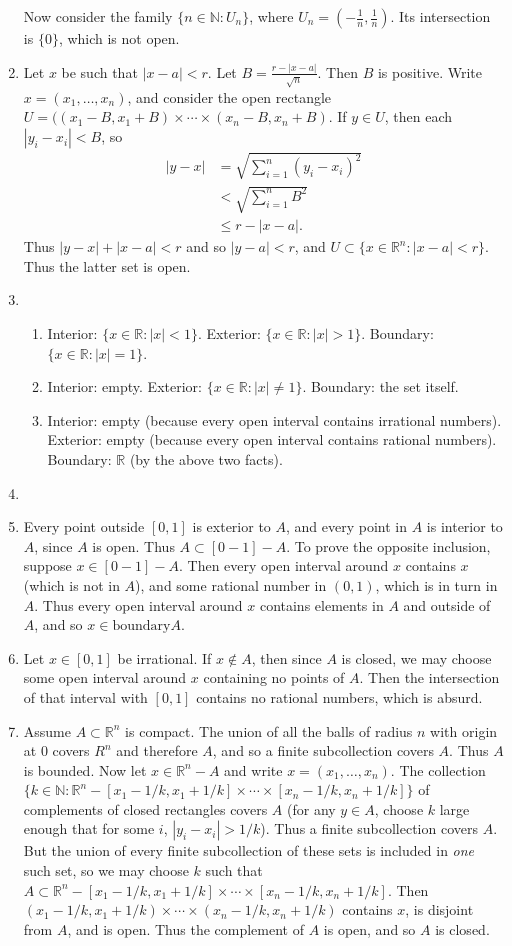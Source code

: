 \documentclass{article}
\begin{document}
\begin{enumerate}[label=\textbf{1-\arabic*.}]
Now consider the family $\{n\in\mathbb N: U_n\}$, where $U_n = (-\frac{1}{n},\frac{1}{n})$. Its intersection is $\{0\}$, which is not open.
\item Let $x$ be such that $|x-a|<r$. Let $B=\frac{r-|x-a|}{\sqrt{n}}$. Then $B$ is positive. Write $x=(x_1, \ldots, x_n)$, and consider the open rectangle $U=((x_1-B,x_1+B)\times\cdots\times (x_n-B,x_n+B)$. If $y\in U$, then each $|y_i - x_i| < B$, so 
\begin{align*}
|y-x| &= \sqrt{\sum_{i=1}^n (y_i - x_i) ^2}\\
	& < \sqrt{\sum_{i=1}^n B^2}\\
	& \leq r - |x-a|.
\end{align*}
Thus $|y-x| + |x-a| < r$ and so $|y-a| < r$, and $U\subset \{x\in\mathbb R^n:|x-a|<r\}$. Thus the latter set is open.
\item
\begin{enumerate}
\item Interior: $\{x\in\mathbb R: |x|<1\}$. Exterior: $\{x\in\mathbb R: |x|>1\}$. Boundary: $\{x\in\mathbb R: |x|=1\}$.
\item Interior: empty. Exterior: $\{x\in\mathbb R: |x|\neq 1\}$. Boundary: the set itself.
\item Interior: empty (because every open interval contains irrational numbers). Exterior: empty (because every open interval contains rational numbers). Boundary: $\mathbb R$ (by the above two facts).
\end{enumerate}
\item
\item Every point outside $[0,1]$ is exterior to $A$, and every point in $A$ is interior to $A$, since $A$ is open. Thus $A\subset [0-1]-A$. To prove the opposite inclusion, suppose $x\in [0-1]-A$. Then every open interval around $x$ contains $x$ (which is not in $A$), and some rational number in $(0,1)$, which is in turn in $A$. Thus every open interval around $x$ contains elements in $A$ and outside of $A$, and so $x\in\textrm{boundary}A$.
\item Let $x\in[0,1]$ be irrational. If $x\notin A$, then since $A$ is closed, we may choose some open interval around $x$ containing no points of $A$. Then the intersection of that interval with $[0,1]$ contains no rational numbers, which is absurd.
\item Assume $A\subset\mathbb R^n$ is compact. The union of all the balls of radius $n$ with origin at $0$ covers $R^n$ and therefore $A$, and so a finite subcollection covers $A$. Thus $A$ is bounded. Now let $x\in\mathbb R^n-A$ and write $x=(x_1,\ldots,x_n)$. The collection $\{k\in\mathbb N: \mathbb R^n - [x_1-1/k,x_1+1/k]\times\cdots\times[x_n-1/k,x_n+1/k]\}$ of complements of closed rectangles covers $A$ (for any $y\in A$, choose $k$ large enough that for some $i$, $|y_i - x_i| > 1/k$). Thus a finite subcollection covers $A$. But the union of every finite subcollection of these sets is included in \textit{one} such set, so we may choose $k$ such that $A\subset \mathbb R^n - [x_1-1/k,x_1+1/k]\times\cdots\times [x_n-1/k,x_n+1/k]$. Then $(x_1-1/k,x_1+1/k)\times\cdots\times (x_n-1/k,x_n+1/k)$ contains $x$, is disjoint from $A$, and is open. Thus the complement of $A$ is open, and so $A$ is closed.

\end{enumerate}
\end{document}
